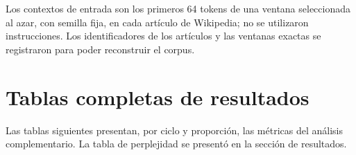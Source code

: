 \documentclass[12pt,letterpaper]{article}
\begin{document}
Los contextos de entrada son los primeros 64 tokens de una ventana
seleccionada al azar, con semilla fija, en cada artículo de Wikipedia;
no se utilizaron instrucciones. Los identificadores de los artículos y las ventanas exactas se
registraron para poder reconstruir el corpus.

\section{Tablas completas de resultados}

Las tablas siguientes presentan, por ciclo y proporción, las métricas
del análisis complementario. La tabla de perplejidad se presentó en la
sección de resultados.





\end{document}
